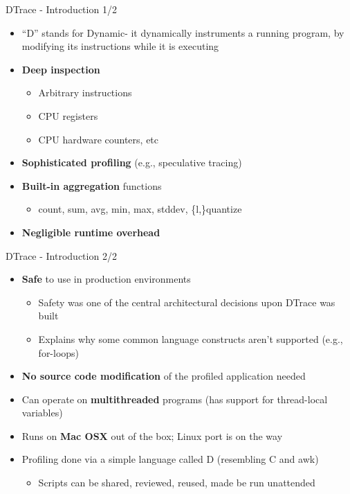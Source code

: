 \documentclass{beamer}
\begin{document}
\begin{frame}{DTrace - Introduction 1/2}
\begin{itemize}
\item ``D'' stands for Dynamic- it dynamically instruments a running program,
by modifying its instructions while it is executing
\item {\bf Deep inspection}
\begin{itemize}
\item Arbitrary instructions
\item CPU registers
\item CPU hardware counters, etc
\end{itemize}
\item {\bf Sophisticated profiling} (e.g., speculative tracing)
\vspace{5mm}
\item {\bf Built-in aggregation} functions
\begin{itemize}
\item count, sum, avg, min, max, stddev, \{l,\}quantize
\end{itemize}

\item {\bf Negligible runtime overhead}
\end{itemize}
\end{frame}

\begin{frame}{DTrace - Introduction 2/2}
\begin{itemize}
\item {\bf Safe} to use in production environments
\begin{itemize}
\item Safety was one of the central architectural decisions upon DTrace was built
\item Explains why some common language constructs aren't supported (e.g., for-loops)
\end{itemize}

\item {\bf No source code modification} of the profiled application needed
\item Can operate on {\bf multithreaded} programs (has support for thread-local variables)
\item Runs on {\bf Mac OSX} out of the box; Linux port is on the way
\item Profiling done via a simple language called D (resembling C and awk)
\begin{itemize}
\item Scripts can be shared, reviewed, reused, made be run unattended
\end{itemize}
\end{itemize}
\end{frame}
\end{document}
